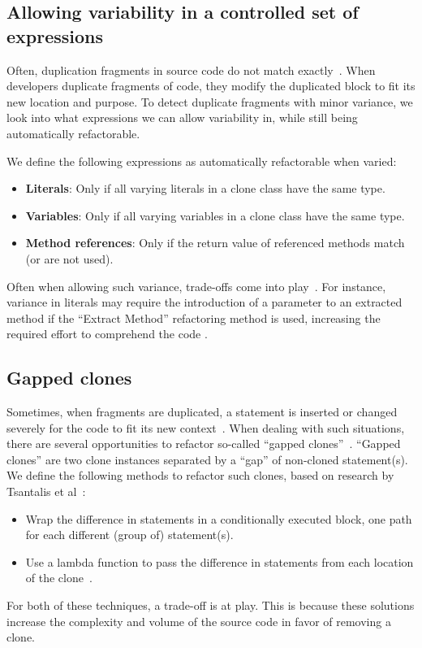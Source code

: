 \documentclass[sigconf,review,anonymous]{acmart}
\begin{document}
\subsection{Allowing variability in a controlled set of expressions} \label{sec:t2r}
Often, duplication fragments in source code do not match exactly~\cite{kodhai2013method}. When developers duplicate fragments of code, they modify the duplicated block to fit its new location and purpose. To detect duplicate fragments with minor variance, we look into what expressions we can allow variability in, while still being automatically refactorable.

We define the following expressions as automatically refactorable when varied:
\begin{itemize}
  \item \textbf{Literals}: Only if all varying literals in a clone class have the same type.
  \item \textbf{Variables}: Only if all varying variables in a clone class have the same type.
  \item \textbf{Method references}: Only if the return value of referenced methods match (or are not used).
\end{itemize}
Often when allowing such variance, trade-offs come into play~\cite{krishnan2013refactoring, krishnan2014unification}. For instance, variance in literals may require the introduction of a parameter to an extracted method if the ``Extract Method'' refactoring method is used, increasing the required effort to comprehend the code \cite{heitlager2007practical}.

\subsection{Gapped clones} \label{sec:t3r}
Sometimes, when fragments are duplicated, a statement is inserted or changed severely for the code to fit its new context~\cite{roy2007survey}. When dealing with such situations, there are several opportunities to refactor so-called ``gapped clones''~\cite{ueda2002detection, zhao2018automatic}. ``Gapped clones'' are two clone instances separated by a ``gap'' of non-cloned statement(s). We define the following methods to refactor such clones, based on research by Tsantalis et al~\cite{tsantalis2015assessing}:
\begin{itemize}
  \item Wrap the difference in statements in a conditionally executed block, one path for each different (group of) statement(s).
  \item Use a lambda function to pass the difference in statements from each location of the clone~\cite{tsantalis2017clone}.
\end{itemize}
For both of these techniques, a trade-off is at play. This is because these solutions increase the complexity and volume of the source code in favor of removing a clone.
\end{document}

